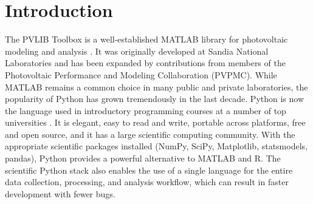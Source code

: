 \documentclass[conference]{IEEEtran}
\begin{document}
%



\section{Introduction}

The PVLIB Toolbox is a well-established MATLAB library for photovoltaic modeling and analysis \cite{pvlibstein}. 
It was originally developed at Sandia National Laboratories and has been expanded by contributions from members of the Photovoltaic Performance and Modeling Collaboration (PVPMC).
While MATLAB remains a common choice in many public and private laboratories, the popularity of Python has grown tremendously in the last decade. 
Python is now the language used in introductory programming courses at a number of top universities \cite{Per11, acmpython}. 
It is elegant, easy to read and write, portable across platforms, free and open source, and it has a large scientific computing community. 
With the appropriate scientific packages installed (NumPy, SciPy, Matplotlib, statsmodels, pandas), Python provides a powerful alternative to MATLAB and R. 
The scientific Python stack also enables the use of a single language for the entire data collection, processing, and analysis workflow, which can result in faster development with fewer bugs. 
\end{document}
